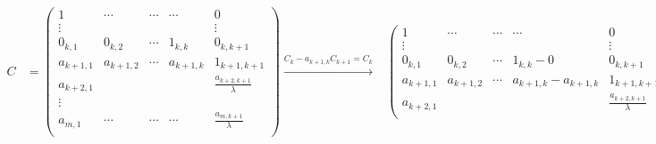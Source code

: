 \documentclass{report}
\begin{document}
{{{			\begin{align*}
				C                  & = \begin{pmatrix}
					                       1            & \cdots     & \cdots & \cdots     & 0                              \\
					                       \vdots       &            &        &            & \vdots                         \\
					                       0_{k, 1}     & 0_{k, 2}   & \cdots & 1_{k, k}   & 0_{k, k+1}                     \\
					                       a_{k+1, 1}   & a_{k+1, 2} & \cdots & a_{k+1, k} & 1_{k+1,k+1}                    \\
					                       a_{k + 2, 1} &            &        &            & \frac{a_{k + 2, k+1}}{\lambda} \\
					                       \vdots       &            &        &            &                                \\
					                       a_{m, 1}     & \cdots     & \cdots & \cdots     & \frac{a_{m, k+1}}{\lambda}     \\
				                       \end{pmatrix} \xrightarrow{C_{k} -  a_{k+1, k} C_{k+1} = C_{k}} & \begin{pmatrix}
					                                                                                         1            & \cdots     & \cdots & \cdots                                         & 0                             \\
					                                                                                         \vdots       &            &        &                                                & \vdots                        \\
					                                                                                         0_{k, 1}     & 0_{k, 2}   & \cdots & 1_{k, k}  - 0                                  & 0_{k, k+1}                    \\
					                                                                                         a_{k+1, 1}   & a_{k+1, 2} & \cdots & a_{k+1, k} - a_{k+1, k}                        & 1_{k+1,k+1}                   \\
					                                                                                         a_{k + 2, 1} &            &        &                                                & \frac{a_{k+ 2, k+1}}{\lambda} \\

\end{pmatrix}
\end{align*}}}}
\end{document}
